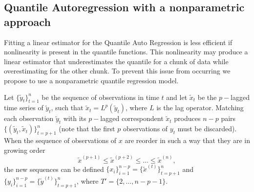 \subsection{Quantile Autoregression with a nonparametric approach}
\label{sec:npqar}

Fitting a linear estimator for the Quantile Auto Regression is less efficient if nonlinearity is present in the quantile functions. This nonlinearity may produce a linear estimator that underestimates the quantile for a chunk of data while overestimating for the other chunk. To prevent this issue from occurring we propose to use a nonparametric quantile regression model. 



Let $\{\tilde{y}_t \}_{t=1}^n$ be the sequence of observations in time $t$ and let $\tilde{x}_t$ be the $p-$lagged time series of $\tilde{y}_t$, such that $\tilde{x}_t = L^p(\tilde{y}_t)$, where $L$ is the lag operator. Matching each observation $\tilde{y}_t$ with its $p-$lagged correspondent $\tilde{x}_t$ produces $n-p$ pairs $\{(\tilde{y}_t,\tilde{x}_t)\}_{t=p+1}^n$ (note that the first $p$ observations of $y_t$ must be discarded). When the sequence of observations of $x$ are reorder in such a way that they are in growing order
$$\tilde{x}^{(p+1)} \leq \tilde{x}^{(p+2)} \leq \dots \leq \tilde{x}^{(n)},$$ 
the new sequences can be defined $\{x_i\}_{i=1}^{n-p} = \{\tilde{x}^{(t)} \}_{t=p+1}^{n}$ and $\{y_i\}_{i=1}^{n-p} = \{\tilde{y}^{(t)} \}_{t=p+1}^{n}$, where $T' = \{2,\dots, n-p-1\}$. 

